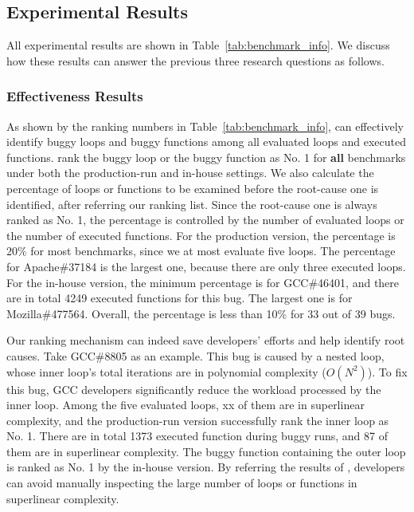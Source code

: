 \subsection{Experimental Results}
\label{sec:results}

All experimental results are shown in Table~\ref{tab:benchmark_info}.
We discuss how these results can answer the previous three research questions as follows.


\subsubsection{Effectiveness Results}
As shown by the ranking numbers in Table~\ref{tab:benchmark_info},
\Tool can effectively identify buggy loops and buggy functions 
among all evaluated loops and executed functions. 
\Tool rank the buggy loop or the buggy function as No. 1 
for \textbf{all} benchmarks under both the production-run and in-house settings. 
We also calculate the percentage of loops or functions 
to be examined before the root-cause one is identified, 
after referring our ranking list. 
Since the root-cause one is always ranked as No. 1,
the percentage is controlled by the number of evaluated loops 
or the number of executed functions. 
For the production version, the percentage is $20\%$ for most benchmarks, 
since we at most evaluate five loops. 
The percentage for Apache\#37184 is the largest one, 
because there are only three executed loops. 
For the in-house version, the minimum percentage is for GCC\#46401, 
and there are in total 4249 executed functions for this bug.
The largest one is for Mozilla\#477564. 
Overall, the percentage is less than 10\% for 33 out of 39 bugs. 

Our ranking mechanism can indeed save developers' efforts 
and help identify root causes. 
Take GCC\#8805 as an example.
This bug is caused by a nested loop, 
whose inner loop's total iterations are in polynomial complexity ($O(N^2)$).
To fix this bug, GCC developers significantly reduce 
the workload processed by the inner loop. 
Among the five evaluated loops, xx of them are in superlinear complexity, and 
the production-run version successfully rank the inner loop as No. 1.
There are in total 1373 executed function during buggy runs,
and 87 of them are in superlinear complexity. 
The buggy function containing the outer loop is ranked as No. 1 
by the in-house version. 
By referring the results of \Tool, 
developers can avoid manually inspecting the large number of  
loops or functions in superlinear complexity. 


